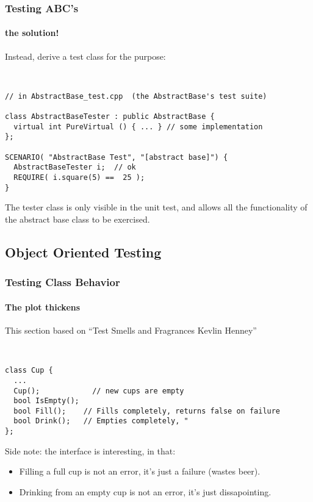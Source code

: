 \begin{frame}[fragile,t]
\frametitle{Testing ABC's}
\framesubtitle{the solution!}
Instead, derive a test class for the purpose:
{\scriptsize\
\begin{verbatim}
// in AbstractBase_test.cpp  (the AbstractBase's test suite)

class AbstractBaseTester : public AbstractBase {
  virtual int PureVirtual () { ... } // some implementation 
};

SCENARIO( "AbstractBase Test", "[abstract base]") {
  AbstractBaseTester i;  // ok
  REQUIRE( i.square(5) ==  25 );
}
\end{verbatim}}
The tester class is only visible in the unit test, and allows all the
functionality of the abstract base class to be exercised.

\end{frame}


\subsection{Object Oriented Testing}
\begin{frame}[fragile,t]
\frametitle{Testing Class Behavior}
\framesubtitle{The plot thickens}
This section based on
``Test Smells and Fragrances Kevlin Henney'' 
{\scriptsize\
\begin{verbatim}
class Cup {
  ...
  Cup();            // new cups are empty
  bool IsEmpty(); 
  bool Fill();    // Fills completely, returns false on failure
  bool Drink();   // Empties completely, "
};

\end{verbatim}}

Side note: the interface is interesting, in that:
\begin{itemize}
  \item Filling a full cup is not an error, it's just a failure
    (wastes beer).
  \item Drinking from an empty cup is not an error, it's just
    dissapointing.
\end{itemize}


\end{frame}

